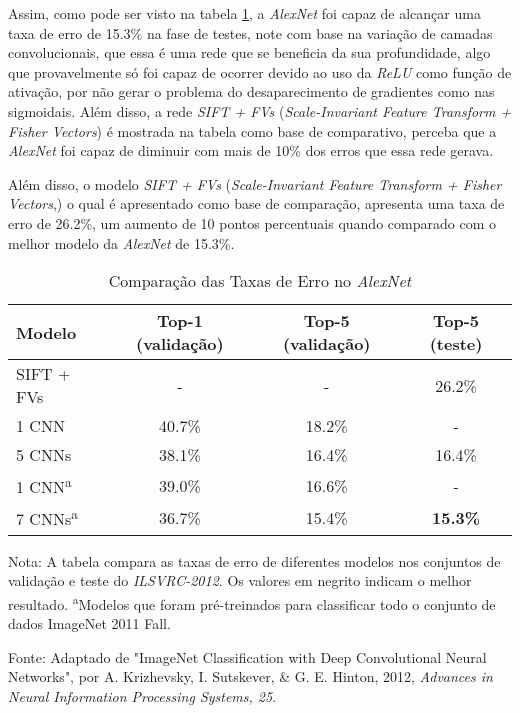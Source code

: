 Assim, como pode ser visto na tabela \ref{tab:desempenho-alexnet}, a \textit{AlexNet} foi capaz de alcançar uma taxa de erro de 15.3\% na fase de testes, note com base na variação de camadas convolucionais, que essa é uma rede que se beneficia da sua profundidade, algo que provavelmente só foi capaz de ocorrer devido ao uso da \textit{ReLU} como função de ativação, por não gerar o problema do desaparecimento de gradientes como nas sigmoidais. Além disso, a rede \textit{SIFT + FVs} (\textit{Scale-Invariant Feature Transform + Fisher Vectors}) é mostrada na tabela como base de comparativo, perceba que a \textit{AlexNet} foi capaz de diminuir com mais de 10\% dos erros que essa rede gerava.

Além disso, o modelo \textit{SIFT + FVs} (\textit{Scale-Invariant Feature Transform + Fisher Vectors},) o qual é apresentado como base de comparação, apresenta uma taxa de erro de 26.2\%, um aumento de 10 pontos percentuais quando comparado com o melhor modelo da \textit{AlexNet} de 15.3\%.

\begin{table}[ht]
    \centering
    \begin{threeparttable}
        \caption{Comparação das Taxas de Erro no \textit{AlexNet}}
        \label{tab:desempenho-alexnet}
        \begin{tabular}{lccc}
            \toprule
            \textbf{Modelo} & \textbf{Top-1 (validação)} & \textbf{Top-5 (validação)} & \textbf{Top-5 (teste)} \\
            \midrule
            SIFT + FVs & -    & -      & 26.2\% \\
            1 CNN      & 40.7\% & 18.2\% & -      \\
            5 CNNs     & 38.1\% & 16.4\% & 16.4\% \\
            1 CNN\textsuperscript{a}      & 39.0\% & 16.6\% & -      \\
            7 CNNs\textsuperscript{a}     & 36.7\% & 15.4\% & \textbf{15.3\%} \\
            \bottomrule
        \end{tabular}
        
        \begin{tablenotes}[para] %
            \small %
            \item[] Nota: A tabela compara as taxas de erro de diferentes modelos nos conjuntos de validação e teste do \textit{ILSVRC-2012}. Os valores em negrito indicam o melhor resultado. \textsuperscript{a}Modelos que foram pré-treinados para classificar todo o conjunto de dados ImageNet 2011 Fall.
            \item[] Fonte: Adaptado de "ImageNet Classification with Deep Convolutional Neural Networks", por A. Krizhevsky, I. Sutskever, \& G. E. Hinton, 2012, \textit{Advances in Neural Information Processing Systems, 25}.
        \end{tablenotes}

    \end{threeparttable}
\end{table}

